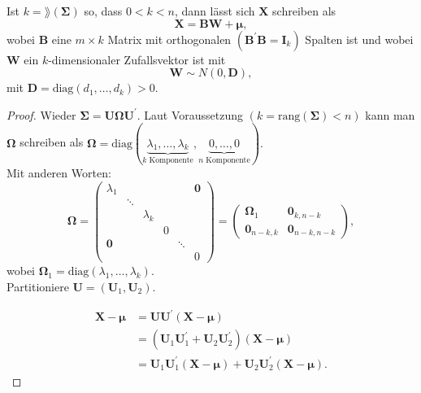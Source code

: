 \documentclass{tstextbook}
\begin{document}
\begin{theorem}
	
	Ist $ k = \rang(\boldsymbol{\Sigma}) $ so, dass $ 0<k<n $, dann lässt sich $ \mathbf{X} $ schreiben als 
	\[
	\mathbf{X} = \mathbf{B}\mathbf{W}+\boldsymbol{\mu},
	\]
	wobei $ \mathbf{B} $ eine $ m\times k $ Matrix mit orthogonalen $ \left(\mathbf{B}^\prime \mathbf{B} = \mathbf{I}_k \right)  $ Spalten ist und wobei $ \mathbf{W} $ ein $ k $-dimensionaler Zufallsvektor ist mit 
	\[
	\mathbf{W} \sim N(0,\mathbf{D}),
	\]
	mit $ \mathbf{D} = \text{diag}\left(d_1,\ldots,d_k\right) > 0. $
\end{theorem}

\begin{proof}
	Wieder $ \boldsymbol{\Sigma} = \mathbf{U} \mathbf{\Omega} \mathbf{U}^\prime. $ Laut Voraussetzung $ (k=\text{rang}(\boldsymbol{\Sigma})<n) $ kann man $ \mathbf{\Omega} $ schreiben als $ \mathbf{\Omega} = \text{diag}(\underbrace{\lambda_1,\ldots,\lambda_k}_{k \text{ Komponente}}, \underbrace{0, \ldots, 0}_{n \text{ Komponente}}). $ \\
	Mit anderen Worten:
	\[
	\mathbf{\Omega} = \begin{pmatrix}
		\lambda_1 	& 		& 				& 		& 		& \boldsymbol{0}\\
					& \ddots&				&		&& \\
					& 		&  \lambda_k \\
					& 		& 		& 0 \\
				\boldsymbol{0}	&		& 		& 		& \ddots \\
				 	& 		& 		& 		& 		& 0
	\end{pmatrix} = \begin{pmatrix}
	\mathbf{\Omega}_1 		& \boldsymbol{0}_{k,n-k} \\
	\boldsymbol{0}_{n-k,k}		& \boldsymbol{0}_{n-k,n-k}
\end{pmatrix},
	\] 
	wobei $ \mathbf{\Omega}_1 = \text{diag}(\lambda_1,\ldots, \lambda_k). $ \\
	
	Partitioniere $ \mathbf{U} = \left(\mathbf{U}_1, \mathbf{U}_2\right). $ 
	
	\[ 
	\begin{aligned}
	\mathbf{X}-\boldsymbol{\mu} & = \mathbf{U} \mathbf{U}^\prime (\mathbf{X}-\boldsymbol{\mu}) \\
	& = \left(\mathbf{U}_1 \mathbf{U}_1^\prime + \mathbf{U}_2 \mathbf{U}_2^\prime\right)(\mathbf{X}-\boldsymbol{\mu}) \\
	& = \mathbf{U}_1 \mathbf{U}_1^\prime (\mathbf{X}-\boldsymbol{\mu}) + \mathbf{U}_2 \mathbf{U}_2^\prime (\mathbf{X}-\boldsymbol{\mu}).
	\end{aligned}
	\]
	

\end{proof}
\end{document}
